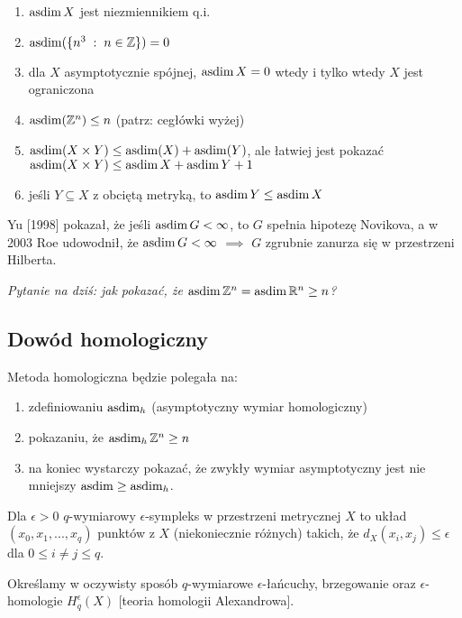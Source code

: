 \begin{enumerate}
  \item $\operatorname{asdim} X$ jest niezmiennikiem q.i.
  \item $\operatorname{asdim}(\{n^3\;:\;n\in\mathbb{Z}\})=0$
  \item dla $X$ asymptotycznie spójnej, $\operatorname{asdim} X=0$ wtedy i tylko wtedy $X$ jest ograniczona
  \item $\operatorname{asdim}(\mathbb{Z}^n)\leq n$ (patrz: cegłówki wyżej)
  \item $\operatorname{asdim} (X\times Y)\leq \operatorname{asdim} (X)+\operatorname{asdim}(Y)$, ale łatwiej jest pokazać $\operatorname{asdim}(X\times Y)\leq \operatorname{asdim} X+\operatorname{asdim} Y+1$
  \item jeśli $Y\subseteq X$ z obciętą metryką, to $\operatorname{asdim} Y\leq \operatorname{asdim} X$
\end{enumerate}

Yu [1998] pokazał, że jeśli $\operatorname{asdim} G<\infty$, to $G$ spełnia hipotezę Novikova, a w 2003 Roe udowodnił, że $\operatorname{asdim} G<\infty$ $\implies$ $G$ zgrubnie zanurza się w przestrzeni Hilberta.

\begin{center}\slshape\large
Pytanie na dziś: jak pokazać, że $\operatorname{asdim}\mathbb{Z}^n=\operatorname{asdim}\mathbb{R}^n\geq n$?
\end{center}

\subsection{Dowód homologiczny}

Metoda homologiczna będzie polegała na:
\begin{enumerate}
  \item zdefiniowaniu $\operatorname{asdim}_h$ (asymptotyczny wymiar homologiczny)
  \item pokazaniu, że $\operatorname{asdim}_h\mathbb{Z}^n\geq n$
  \item na koniec wystarczy pokazać, że zwykły wymiar asymptotyczny jest nie mniejszy $\operatorname{asdim} \geq \operatorname{asdim}_h$.
\end{enumerate}

\begin{definition}{}{}
  Dla $\epsilon>0$ $q$-wymiarowy $\epsilon$-sympleks w przestrzeni metrycznej $X$ to układ $(x_0,x_1,...,x_q)$ punktów z $X$ (niekoniecznie różnych) takich, że $d_X(x_i, x_j)\leq\epsilon$ dla $0\leq i\neq j\leq q$.
\end{definition}

Określamy w oczywisty sposób $q$-wymiarowe $\epsilon$-łańcuchy, brzegowanie oraz $\epsilon$-homologie $H_q^\epsilon(X)$ [teoria homologii Alexandrowa].

